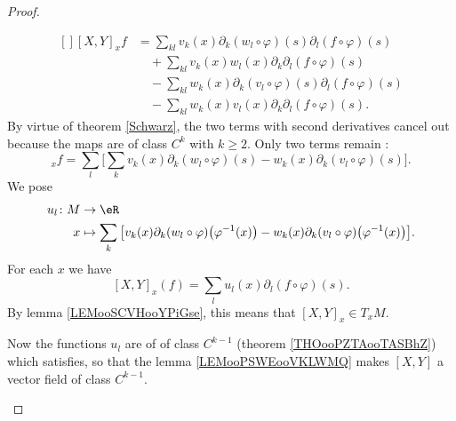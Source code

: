 \begin{proof}
\begin{subproof}
		\begin{equation}
			\begin{aligned}[]
				[X,Y]_xf & =\sum_{kl}v_k(x)\partial_k(w_l\circ\varphi)(s)\partial_l(f\circ\varphi)(s)       \\
				         & \quad+\sum_{kl}v_k(x)w_l(x)\partial_k\partial_l(f\circ\varphi)(s)                \\
				         & \quad -\sum_{kl}w_k(x)\partial_k(v_l\circ\varphi)(s)\partial_l(f\circ\varphi)(s) \\
				         & \quad -\sum_{kl}w_k(x)v_l(x)\partial_k\partial_l(f\circ\varphi)(s).
			\end{aligned}
		\end{equation}
		By virtue of theorem \ref{Schwarz}, the two terms with second derivatives cancel out because the maps are of class \( C^k\) with \( k\geq 2\). Only two terms remain :
		\begin{equation}
			[X,Y]_xf=\sum_l\big[ \sum_kv_k(x)\partial_k(w_l\circ\varphi)(s)-w_k(x)\partial_k(v_l\circ\varphi)(s) \big].
		\end{equation}
		We pose
		\begin{equation}
			\begin{aligned}
				u_l\colon M & \to \eR                                                                                                                                               \\
				x           & \mapsto  \sum_k\big[ v_k(x)\partial_k(w_l\circ\varphi)\big( \varphi^{-1}(x) \big)-w_k(x)\partial_k(v_l\circ\varphi)\big( \varphi^{-1}(x) \big) \big].
			\end{aligned}
		\end{equation}
		For each \( x\) we have
		\begin{equation}        \label{EQooVUOKooAyGoae}
			[X,Y]_x(f)=\sum_lu_l(x)\partial_l(f\circ\varphi)(s).
		\end{equation}
		By lemma \ref{LEMooSCVHooYPiGse}, this means that \( [X,Y]_x\in T_xM\).

		\spitem[\ref{ITEMooPGPLooQrKxWY}]

		Now the functions \( u_l\) are of of class \( C^{k-1}\) (theorem \ref{THOooPZTAooTASBhZ}) which satisfies, so that the lemma \ref{LEMooPSWEooVKLWMQ} makes \( [X,Y] \) a vector field of class \( C^{k-1}\).
	\end{subproof}
\end{proof}


